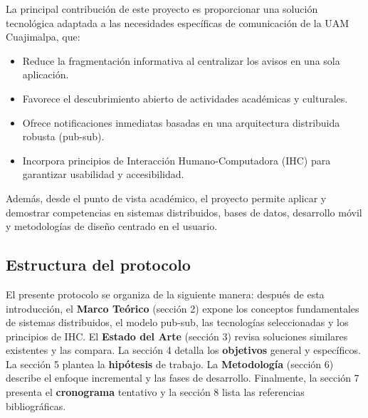 La principal contribución de este proyecto es proporcionar una solución tecnológica adaptada a las necesidades específicas de comunicación de la UAM Cuajimalpa, que:

\begin{itemize}
    \item Reduce la fragmentación informativa al centralizar los avisos en una sola aplicación.
    \item Favorece el descubrimiento abierto de actividades académicas y culturales.
    \item Ofrece notificaciones inmediatas basadas en una arquitectura distribuida robusta (pub-sub).
    \item Incorpora principios de Interacción Humano-Computadora (IHC) para garantizar usabilidad y accesibilidad.
\end{itemize}

Además, desde el punto de vista académico, el proyecto permite aplicar y demostrar competencias en sistemas distribuidos, bases de datos, desarrollo móvil y metodologías de diseño centrado en el usuario.

\subsection{Estructura del protocolo}

El presente protocolo se organiza de la siguiente manera: después de esta introducción, el \textbf{Marco Teórico} (sección 2) expone los conceptos fundamentales de sistemas distribuidos, el modelo pub-sub, las tecnologías seleccionadas y los principios de IHC. El \textbf{Estado del Arte} (sección 3) revisa soluciones similares existentes y las compara. La sección 4 detalla los \textbf{objetivos} general y específicos. La sección 5 plantea la \textbf{hipótesis} de trabajo. La \textbf{Metodología} (sección 6) describe el enfoque incremental y las fases de desarrollo. Finalmente, la sección 7 presenta el \textbf{cronograma} tentativo y la sección 8 lista las referencias bibliográficas.